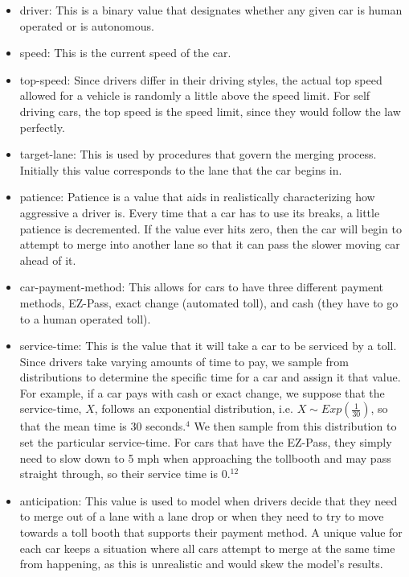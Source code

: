 \documentclass{article}
\begin{document}
\begin{itemize}
\item driver: This is a binary value that designates whether any given car is human operated or is autonomous. 
\item speed: This is the current speed of the car.
\item top-speed: Since drivers differ in their driving styles, the actual top speed allowed for a vehicle is randomly a little above the speed limit. For self driving cars, the top speed is the speed limit, since they would follow the law perfectly.
\item target-lane: This is used by procedures that govern the merging process. Initially this value corresponds to the lane that the car begins in.
\item patience: Patience is a value that aids in realistically characterizing how aggressive a driver is. Every time that a car has to use its breaks, a little patience is decremented. If the value ever hits zero, then the car will begin to attempt to merge into another lane so that it can pass the slower moving car ahead of it. 
\item car-payment-method: This allows for cars to have three different payment methods, EZ-Pass, exact change (automated toll), and cash (they have to go to a human operated toll).
\item service-time: This is the value that it will take a car to be serviced by a toll. Since drivers take varying amounts of time to pay, we sample from distributions to determine the specific time for a car and assign it that value. For example, if a car pays with cash or exact change, we suppose that the service-time, $X$, follows an exponential distribution, i.e. $X \sim Exp(\frac{1}{30})$, so that the mean time is 30 seconds.$^{4}$ We then sample from this distribution to set the particular service-time. For cars that have the EZ-Pass, they simply need to slow down to 5 mph when approaching the tollbooth and may pass straight through, so their service time is 0.$^{\text{12}}$
\item anticipation: This value is used to model when drivers decide that they need to merge out of a lane with a lane drop or when they need to try to move towards a toll booth that supports their payment method. A unique value for each car keeps a situation where all cars attempt to merge at the same time from happening, as this is unrealistic and would skew the model's results.
\end{itemize}
\end{document}
